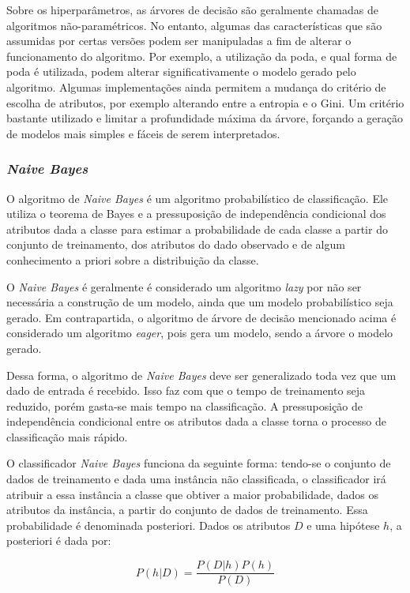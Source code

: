 \documentclass{article}
\begin{document}
Sobre os hiperparâmetros, as árvores de decisão são geralmente chamadas de algoritmos não-paramétricos.
No entanto, algumas das características que são assumidas por certas versões podem ser manipuladas
a fim de alterar o funcionamento do algoritmo.
Por exemplo, a utilização da poda, e qual forma de poda é utilizada,
podem alterar significativamente o modelo gerado pelo algoritmo.
Algumas implementações ainda permitem a mudança do critério de escolha de atributos,
por exemplo alterando entre a entropia e o Gini.
Um critério bastante utilizado e limitar a profundidade máxima da árvore,
forçando a geração de modelos mais simples e fáceis de serem interpretados.


\subsubsection{{\b \it Naive Bayes}}

O algoritmo de {\it Naive Bayes} é um algoritmo probabilístico de classificação. Ele utiliza o teorema de Bayes e a pressuposição de independência condicional dos atributos dada a classe para estimar a probabilidade de cada classe a partir do conjunto de treinamento, dos atributos do dado observado e de algum conhecimento a priori sobre a distribuição da classe.

O {\it Naive Bayes} é geralmente é considerado um algoritmo {\it lazy} por não ser necessária a construção de um modelo, ainda que um modelo probabilístico seja gerado. Em contrapartida, o algoritmo de árvore de decisão mencionado acima é considerado um algoritmo {\it eager}, pois gera um modelo, sendo a árvore o modelo gerado.

Dessa forma, o algoritmo de {\it Naive Bayes} deve ser generalizado toda vez que um dado de entrada é recebido. Isso faz com que o tempo de treinamento seja reduzido, porém gasta-se mais tempo na classificação. A pressuposição de independência condicional entre os atributos dada a classe torna o processo de classificação mais rápido.

O classificador {\it Naive Bayes} funciona da seguinte forma: tendo-se o conjunto de dados de treinamento e dada uma instância não classificada, o classificador irá atribuir a essa instância a classe que obtiver a maior probabilidade, dados os atributos da instância, a partir do conjunto de dados de treinamento. Essa probabilidade é denominada posteriori. Dados os atributos $D$ e uma hipótese $h$, a posteriori é dada por:

\begin{equation}
P(h|D) = \frac{P(D|h) P(h)}{P(D)}
\end{equation}
\end{document}
